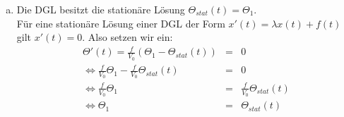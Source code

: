 \documentclass[11pt,a4paper,ngerman]{article}
\begin{document}
\begin{enumerate}[a)]
%
%
%
%
\item Die DGL besitzt die stationäre Lösung $\Theta_{stat}(t) = \Theta_1$. \\

Für eine stationäre Lösung einer DGL der Form $x'(t) = \lambda x(t) + f(t)$ gilt $x'(t) = 0$. Also setzen wir ein:
\begin{eqnarray*}
\Theta'(t) = \frac{f}{V_0} (\Theta_1 - \Theta_{stat}(t)) &=& 0 \\
 \Leftrightarrow \frac{f}{V_0} \Theta_1 - \frac{f}{V_0} \Theta_{stat}(t) &=& 0\\
 \Leftrightarrow \frac{f}{V_0} \Theta_1 &=& \frac{f}{V_0} \Theta_{stat}(t) \\
 \Leftrightarrow \Theta_1 &=& \Theta_{stat}(t)
\end{eqnarray*}


\end{enumerate}
\end{document}
